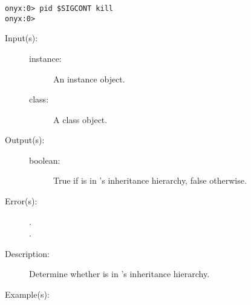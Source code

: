 \begin{description}
\begin{description}
\begin{verbatim}
onyx:0> pid $SIGCONT kill
onyx:0>
		\end{verbatim}
	\end{description}
\label{systemdict:kind}
\item[{\onyxop{instance class}{kind}{boolean}}: ]
	\begin{description}\item[]
	\item[Input(s): ]
		\begin{description}\item[]
		\item[instance: ]
			An instance object.
		\item[class: ]
			A class object.
		\end{description}
	\item[Output(s): ]
		\begin{description}\item[]
		\item[boolean: ]
			True if  is in 's
			inheritance hierarchy, false otherwise.
		\end{description}
	\item[Error(s): ]
		\begin{description}\item[]
		\item[.]
		\item[.]
		\end{description}
	\item[Description: ]
		Determine whether  is in 's
		inheritance hierarchy.
	\item[Example(s): ]\begin{verbatim}


\end{verbatim}
\end{description}
\end{description}
